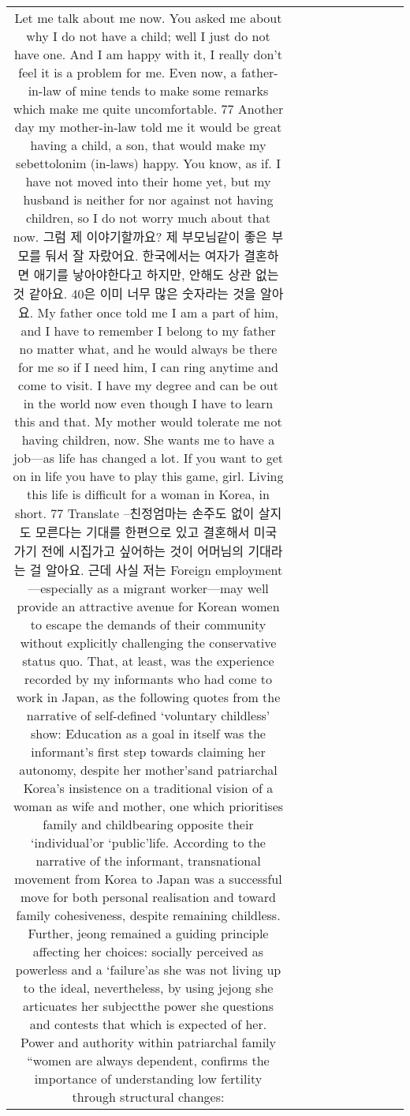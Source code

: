\begin{table}[h!]
\begin{tabular}{|c|c|c|c|c|c|c|c|c|c|}
{Let me talk about me now. You asked me about why I do not have a child; well I just
do not have one. And I am happy with it, I really don’t feel it is a problem for me.
Even now, a father-in-law of mine tends to make some remarks which make me
quite uncomfortable. 77 Another day my mother-in-law told me it would be great
having a child, a son, that would make my sebettolonim (in-laws) happy. You know,
as if. I have not moved into their home yet, but my husband is neither for nor against
not having children, so I do not worry much about that now.
그럼 제 이야기할까요? 제 부모님같이 좋은 부모를 둬서 잘 자랐어요.
한국에서는 여자가 결혼하면 애기를 낳아야한다고 하지만, 안해도 상관 없는
것 같아요. 40은 이미 너무 많은 숫자라는 것을 알아요.
My father once told me I am a part of him, and I have to remember I belong to my
father no matter what, and he would always be there for me so if I need him, I can
ring anytime and come to visit. I have my degree and can be out in the world now
even though I have to learn this and that. My mother would tolerate me not having
children, now. She wants me to have a job—as life has changed a lot. If you want to
get on in life
you have to play this game, girl. Living this life is difficult for a woman
in Korea, in short.
77 Translate –친정엄마는 손주도 없이 살지도 모른다는 기대를 한편으로 있고 결혼해서 미국 가기 전에 시집가고 싶어하는 것이 어머님의 기대라는 걸 알아요. 근데 사실 저는
Foreign employment—especially as a migrant worker—may well provide an attractive avenue for Korean women to escape the demands of their community without explicitly challenging the conservative status quo. That, at least, was the experience recorded by my informants who had come to work in Japan, as the following quotes from the narrative of self-defined ‘voluntary childless’ show:
Education as a goal in itself was the informant’s first step towards claiming her autonomy, despite her mother’sand patriarchal Korea’s insistence on a traditional vision of a woman as wife and mother, one which prioritises family and childbearing opposite their ‘individual’or ‘public’life. According to the narrative of the informant, transnational movement from Korea to Japan was a successful move for both personal realisation and toward family cohesiveness, despite remaining childless. Further, jeong
remained a guiding principle affecting her choices: socially perceived as powerless and a ‘failure’as she was not living up to the ideal, nevertheless, by using jejong she articuates her subjectthe power she questions and contests that which is expected of her.
Power and authority within patriarchal family “women are always dependent, confirms the importance of understanding low fertility through structural changes:
}
\end{tabular}
\end{table}

